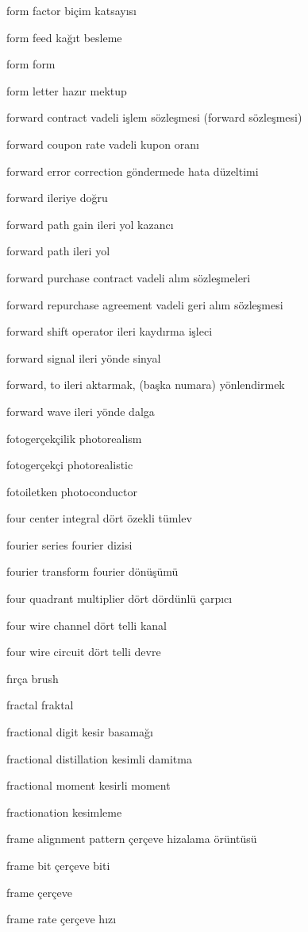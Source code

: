 \documentclass[12pt,fleqn]{article}\usepackage{../../common}
\begin{document}
form factor biçim katsayısı

form feed kağıt besleme

form form

form letter hazır mektup

forward contract vadeli işlem sözleşmesi (forward sözleşmesi)

forward coupon rate vadeli kupon oranı

forward error correction göndermede hata düzeltimi

forward ileriye doğru

forward path gain ileri yol kazancı

forward path ileri yol

forward purchase contract vadeli alım sözleşmeleri

forward repurchase agreement vadeli geri alım sözleşmesi

forward shift operator ileri kaydırma işleci

forward signal ileri yönde sinyal

forward, to ileri aktarmak, (başka numara) yönlendirmek

forward wave ileri yönde dalga

fotogerçekçilik photorealism

fotogerçekçi photorealistic

fotoiletken photoconductor

four center integral dört özekli tümlev

fourier series fourier dizisi

fourier transform fourier dönüşümü

four quadrant multiplier dört dördünlü çarpıcı

four wire channel dört telli kanal

four wire circuit dört telli devre

fırça brush

fractal fraktal

fractional digit kesir basamağı

fractional distillation kesimli damitma

fractional moment kesirli moment

fractionation kesimleme

frame alignment pattern çerçeve hizalama örüntüsü

frame bit çerçeve biti

frame çerçeve

frame rate çerçeve hızı
\end{document}
